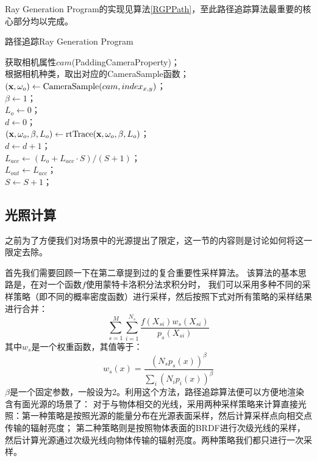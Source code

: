 Ray Generation Program的实现见算法\ref{RGPPath}，至此路径追踪算法最重要的核心部分均以完成。
\begin{algorithm}
    \caption{路径追踪Ray Generation Program}
    \label{RGPPath}

    获取相机属性$cam$(PaddingCameraProperty)；\\
    根据相机种类，取出对应的CameraSample函数；\\
    $(\textbf{x}, \omega_o) \leftarrow {\rm CameraSample}(cam, index_{x,y})$；\\
    $\beta \leftarrow 1$；\\
    $L_o \leftarrow 0$；\\
    $d \leftarrow 0$；\\
    {
        $(\textbf{x}, \omega_o, \beta, L_o) \leftarrow {\rm rtTrace}(\textbf{x}, \omega_o, \beta, L_o)$；\\
        $d \leftarrow d+1$； \\
    }
    $L_{acc} \leftarrow (L_o+L_{acc}\cdot S)/(S+1)$；\\
    $L_{out} \leftarrow L_{acc}$；\\
    $S \leftarrow S+1$；
\end{algorithm}

\subsection{光照计算}

之前为了方便我们对场景中的光源提出了限定，这一节的内容则是讨论如何将这一限定去除。

首先我们需要回顾一下在第二章提到过的复合重要性采样算法。
该算法的基本思路是，在对一个函数$f$使用蒙特卡洛积分法求积分时，
我们可以采用多种不同的采样策略（即不同的概率密度函数）进行采样，然后按照下式对所有策略的采样结果进行合并：
\begin{equation}
    \sum_{s=1}^{M} \sum_{i=1}^{N_s}\frac{f(X_{si})w_s(X_{si})}{p_s(X_{si})}
\end{equation}
其中$w_s$是一个权重函数，其值等于：
\begin{equation}
    w_s(x) = \frac{(N_sp_s(x))^\beta}{\sum_i(N_ip_i(x))^\beta}
\end{equation}
$\beta$是一个固定参数，一般设为2。利用这个方法，路径追踪算法便可以方便地渲染含有面光源的场景了：
对于与物体相交的光线，采用两种采样策略来计算直接光照：第一种策略是按照光源的能量分布在光源表面采样，然后计算采样点向相交点传输的辐射亮度；
第二种策略则是按照物体表面的BRDF进行次级光线的采样，然后计算光源通过次级光线向物体传输的辐射亮度。两种策略我们都只进行一次采样。

